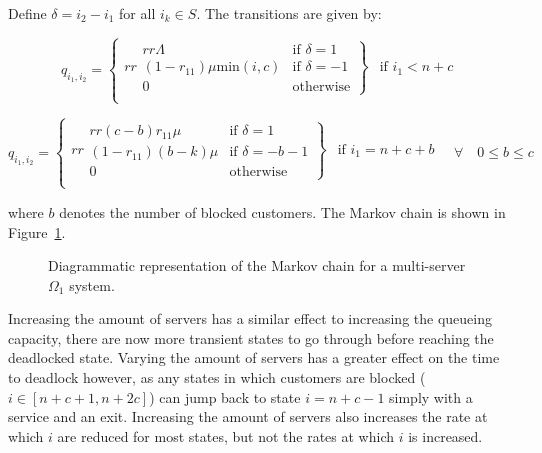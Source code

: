 \documentclass{article}
\numberwithin{equation}{section}
\begin{document}
Define $\delta = i_2 - i_1$ for all $i_k \in S$. The transitions are given by:

\begin{equation}
  q_{i_1, i_2} = \left\{
  \begin{matrix}{rr}
    \left. \begin{matrix}{rr}
      \Lambda & \text{if } \delta = 1 \\
      (1-r_{11})\mu\text{min}(i, c) & \text{if } \delta = -1 \\
      0 & \text{otherwise}
    \end{matrix} \right\} & \text{if } i_1 < n + c \\
  \end{matrix} \right.
\end{equation}

\begin{equation}
  q_{i_1, i_2} = \left\{
  \begin{matrix}{rr}
    \left. \begin{matrix}{rr}
      (c-b)r_{11}\mu & \text{if } \delta = 1 \\
      (1-r_{11})(b-k)\mu & \text{if } \delta = -b-1\\
      0 & \text{otherwise}
    \end{matrix} \right\} & \text{if } i_1 = n + c + b \\
  \end{matrix} \right.
  \quad \forall \quad 0 \leq b \leq c
\end{equation}

where $b$ denotes the number of blocked customers.
The Markov chain is shown in Figure~\ref{fig:1nodeMCms}.

\begin{figure}[!htbp]
    \begin{center}
    
    \end{center}
    \caption{Diagrammatic representation of the Markov chain for a multi-server $\Omega_1$ system.}
    \label{fig:1nodeMCms}
\end{figure}

Increasing the amount of servers has a similar effect to increasing the queueing capacity, there are now more transient states to go through before reaching the deadlocked state.
Varying the amount of servers has a greater effect on the time to deadlock however, as any states in which customers are blocked ($i \in [n+c+1, n+2c]$) can jump back to state $i=n+c-1$ simply with a service and an exit.
Increasing the amount of servers also increases the rate at which $i$ are reduced for most states, but not the rates at which $i$ is increased.
\end{document}
